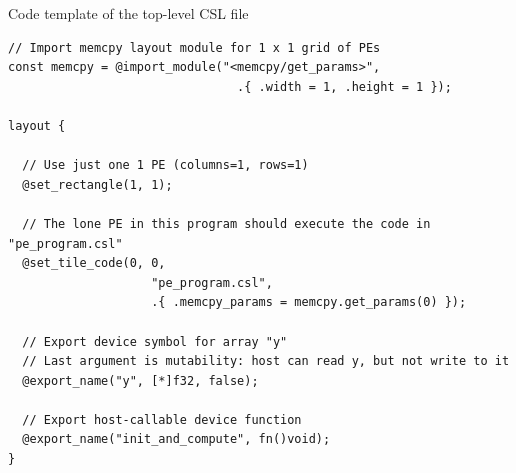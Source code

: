 \documentclass[dvipdfmx, 11pt, aspectratio=169]{beamer}   %
\begin{document}
\begin{frame}[fragile]{Code template of the top-level CSL file}
\begin{lstlisting}[language=CSL, basicstyle=\ttfamily\tiny]
// Import memcpy layout module for 1 x 1 grid of PEs
const memcpy = @import_module("<memcpy/get_params>", 
                                .{ .width = 1, .height = 1 });

layout {

  // Use just one 1 PE (columns=1, rows=1)
  @set_rectangle(1, 1);

  // The lone PE in this program should execute the code in "pe_program.csl"
  @set_tile_code(0, 0, 
                    "pe_program.csl",
                    .{ .memcpy_params = memcpy.get_params(0) });

  // Export device symbol for array "y"
  // Last argument is mutability: host can read y, but not write to it
  @export_name("y", [*]f32, false);

  // Export host-callable device function
  @export_name("init_and_compute", fn()void);
}
\end{lstlisting}
\end{frame}
\end{document}
